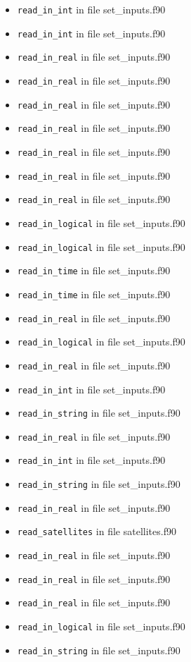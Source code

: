 \begin{itemize}
\begin{itemize}
    \item {\tt read\_in\_int} in file set\_inputs.f90
    \item {\tt read\_in\_int} in file set\_inputs.f90
    \item {\tt read\_in\_real} in file set\_inputs.f90
    \item {\tt read\_in\_real} in file set\_inputs.f90
    \item {\tt read\_in\_real} in file set\_inputs.f90
    \item {\tt read\_in\_real} in file set\_inputs.f90
    \item {\tt read\_in\_real} in file set\_inputs.f90
    \item {\tt read\_in\_real} in file set\_inputs.f90
    \item {\tt read\_in\_real} in file set\_inputs.f90
    \item {\tt read\_in\_logical} in file set\_inputs.f90
    \item {\tt read\_in\_logical} in file set\_inputs.f90
    \item {\tt read\_in\_time} in file set\_inputs.f90
    \item {\tt read\_in\_time} in file set\_inputs.f90
    \item {\tt read\_in\_real} in file set\_inputs.f90
    \item {\tt read\_in\_logical} in file set\_inputs.f90
    \item {\tt read\_in\_real} in file set\_inputs.f90
    \item {\tt read\_in\_int} in file set\_inputs.f90
    \item {\tt read\_in\_string} in file set\_inputs.f90
    \item {\tt read\_in\_real} in file set\_inputs.f90
    \item {\tt read\_in\_int} in file set\_inputs.f90
    \item {\tt read\_in\_string} in file set\_inputs.f90
    \item {\tt read\_in\_real} in file set\_inputs.f90
    \item {\tt read\_satellites} in file satellites.f90
    \item {\tt read\_in\_real} in file set\_inputs.f90
    \item {\tt read\_in\_real} in file set\_inputs.f90
    \item {\tt read\_in\_real} in file set\_inputs.f90
    \item {\tt read\_in\_logical} in file set\_inputs.f90
    \item {\tt read\_in\_string} in file set\_inputs.f90

\end{itemize}
\end{itemize}
